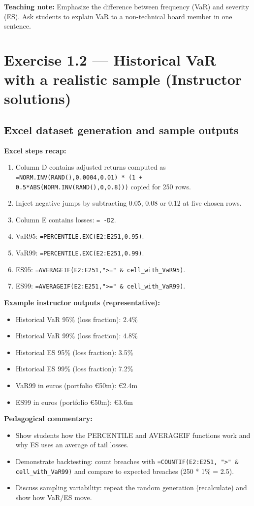 \documentclass[11pt]{article}
\begin{document}
\textbf{Teaching note:} Emphasize the difference between frequency (VaR) and severity (ES). Ask students to explain VaR to a non-technical board member in one sentence.

\newpage
\section{Exercise 1.2 --- Historical VaR with a realistic sample (Instructor solutions)}
\subsection*{Excel dataset generation and sample outputs}
\textbf{Excel steps recap:}
\begin{enumerate}
  \item Column D contains adjusted returns computed as \texttt{=NORM.INV(RAND(),0.0004,0.01) * (1 + 0.5*ABS(NORM.INV(RAND(),0,0.8)))} copied for 250 rows.
  \item Inject negative jumps by subtracting 0.05, 0.08 or 0.12 at five chosen rows.
  \item Column E contains losses: \texttt{= -D2}.
  \item VaR95: \texttt{=PERCENTILE.EXC(E2:E251,0.95)}.
  \item VaR99: \texttt{=PERCENTILE.EXC(E2:E251,0.99)}.
  \item ES95: \texttt{=AVERAGEIF(E2:E251,">=" & cell_with_VaR95)}.
  \item ES99: \texttt{=AVERAGEIF(E2:E251,">=" & cell_with_VaR99)}.
\end{enumerate}

\textbf{Example instructor outputs (representative):}
\begin{itemize}
  \item Historical VaR 95\% (loss fraction): 2.4\%
  \item Historical VaR 99\% (loss fraction): 4.8\%
  \item Historical ES 95\% (loss fraction): 3.5\%
  \item Historical ES 99\% (loss fraction): 7.2\%
  \item VaR99 in euros (portfolio \euro 50m): \euro 2.4m
  \item ES99 in euros (portfolio \euro 50m): \euro 3.6m
\end{itemize}

\textbf{Pedagogical commentary:}
\begin{itemize}
  \item Show students how the PERCENTILE and AVERAGEIF functions work and why ES uses an average of tail losses.
  \item Demonstrate backtesting: count breaches with \texttt{=COUNTIF(E2:E251, ">" & cell_with_VaR99)} and compare to expected breaches (250 * 1\% = 2.5).
  \item Discuss sampling variability: repeat the random generation (recalculate) and show how VaR/ES move.
\end{itemize}
\end{document}
